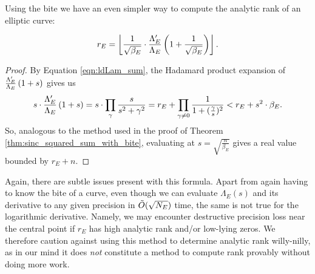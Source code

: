 Using the bite we have an even simpler way to compute the analytic rank of an elliptic curve:
\begin{theorem}[GRH]\label{thm:compute_rank_by_logderiv}
\begin{equation}
r_E = \left\lfloor\frac{1}{\sqrt{\beta_E}}\cdot \frac{\Lambda_E^{\prime}}{\Lambda_E}\left(1+\frac{1}{\sqrt{\beta_E}}\right)\right\rfloor.
\end{equation}
\end{theorem}
\begin{proof}
By Equation \ref{eqn:ldLam_sum}, the Hadamard product expansion of $\frac{\Lambda_E^{\prime}}{\Lambda_E}\left(1+s\right)$ gives us \begin{equation}
s\cdot \frac{\Lambda_E^{\prime}}{\Lambda_E}\left(1+s\right) = s\cdot \prod_{\gamma} \frac{s}{s^2+\gamma^2} = r_E + \prod_{\gamma\ne 0} \frac{1}{1+(\frac{\gamma}{s})^2} < r_E + s^2\cdot \beta_E.
\end{equation}
So, analogous to the method used in the proof of Theorem \ref{thm:sinc_squared_sum_with_bite}, evaluating at $s = \sqrt{\frac{n}{\beta_E}}$ gives a real value bounded by $r_E+n$.
\end{proof}

Again, there are subtle issues present with this formula. Apart from again having to know the bite of a curve, even though we can evaluate $\Lambda_E(s)$ and its derivative to any given precision in $\tilde{O}(\sqrt{N_E})$ time, the same is not true for the logarithmic derivative. Namely, we may encounter destructive precision loss near the central point if $r_E$ has high analytic rank and/or low-lying zeros. We therefore caution against using this method to determine analytic rank willy-nilly, as in our mind it does {\it not} constitute a method to compute rank provably without doing more work.
